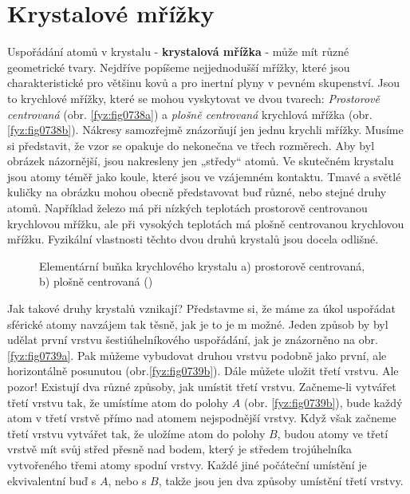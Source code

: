   \section{Krystalové mřížky}\label{fyz:IIchapXXXsecIV}
    Uspořádání atomů v krystalu - \textbf{krystalová mřížka} - může mít různé geometrické tvary. 
    Nejdříve popíšeme nejjednodušší mřížky, které jsou charakteristické pro většinu kovů a pro 
    inertní plyny v pevném skupenství. Jsou to krychlové mřížky, které se mohou vyskytovat ve dvou 
    tvarech: \emph{Prostorově centrovaná} (obr. \ref{fyz:fig0738a}) a \emph{plošně centrovaná} 
    krychlová mřížka (obr. \ref{fyz:fig0738b}). Nákresy samozřejmě znázorňují jen jednu krychli 
    mřížky. Musíme si představit, že vzor se opakuje do nekonečna ve třech rozměrech. Aby byl 
    obrázek názornější, jsou nakresleny jen „středy“ atomů. Ve skutečném krystalu jsou atomy téměř 
    jako koule, které jsou ve vzájemném kontaktu. Tmavé a světlé kuličky na obrázku mohou obecně 
    představovat buď různé, nebo stejné druhy atomů. Například železo má při nízkých teplotách 
    prostorově centrovanou krychlovou mřížku, ale při vysokých teplotách má plošně centrovanou 
    krychlovou mřížku. Fyzikální vlastnosti těchto dvou druhů krystalů jsou docela odlišné.
    
    \begin{figure}[ht!]   %
      \centering
      \label{fyz:fig0738}
      \caption{Elementární buňka krychlového krystalu a) prostorově centrovaná, b) plošně centrovaná
               (\cite[s.~547]{Feynman02})}
    \end{figure}
    
    Jak takové druhy krystalů vznikají? Představme si, že máme za úkol uspořádat sférické atomy 
    navzájem tak těsně, jak je to je m možné. Jeden způsob by byl udělat první vrstvu 
    šestiúhelníkového uspořádání, jak je znázorněno na obr. \ref{fyz:fig0739a}. Pak můžeme vybudovat 
    druhou vrstvu podobně jako první, ale horizontálně posunutou (obr.\ref{fyz:fig0739b}). Dále 
    můžete uložit třetí vrstvu. Ale pozor! Existují dva různé způsoby, jak umístit třetí vrstvu. 
    Začneme-li vytvářet třetí vrstvu tak, že umístíme atom do polohy \(A\) (obr. 
    \ref{fyz:fig0739b}), bude každý atom v třetí vrstvě přímo nad atomem nejspodnější vrstvy. Když 
    však začneme třetí vrstvu vytvářet tak, že uložíme atom do polohy \(B\), budou atomy ve třetí 
    vrstvě mít svůj střed přesně nad bodem, který je středem trojúhelníka vytvořeného třemi atomy 
    spodní vrstvy. Každé jiné počáteční umístění je ekvivalentní buď s \(A\), nebo s \(B\), takže 
    jsou jen dva způsoby umístění třetí vrstvy.
    
